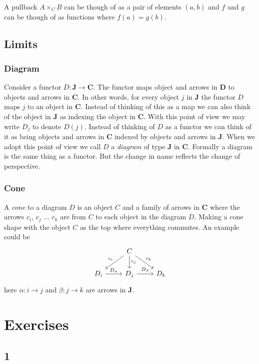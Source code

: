 \documentclass{book}
\theoremstyle{definition}
\begin{document}
A pullback $A \times_{C} B$ can be though of as a pair of elements $(a, b)$ and
$f$ and $g$ can be though of as functions where $f(a) = g(b)$.

\section{Limits}




\subsection{Diagram}

Consider a functor $D : \textbf{J} \to \textbf{C}$. The functor maps object and
arrows in \textbf{D} to objects and arrows in \textbf{C}. In other words, for
every object $j$ in \textbf{J} the functor $D$ maps $j$ to an object in
\textbf{C}. Instead of thinking of this as a map we can also think of the object
in \textbf{J} as indexing the object in \textbf{C}. With this point of view we
may write $D_{j}$ to denote $D(j)$. Instead of thinking of $D$ as a functor we
can think of it as being objects and arrows in \textbf{C} indexed by objects and
arrows in \textbf{J}. When we adopt this point of view we call $D$ a
\emph{diagram} of type \textbf{J} in \textbf{C}. Formally a diagram is the same
thing as a functor. But the change in name reflects the change of perspective.

\subsection{Cone} A \emph{cone} to a diagram $D$ is an object $C$ and a family
of arrows in \textbf{C} where the arrows $c_i$, $c_j$ ... $c_k$ are from $C$ to
each object in the diagram $D$. Making a cone shape with the object $C$ as the
top where everything commutes. An example could be
\[
\begin{tikzcd}
                          & C \arrow[dl, "c_i"'] \arrow[d, "c_j"] \arrow[dr, "c_k"]  \\
  D_i \arrow[r, "D_\alpha"] & D_j \arrow[r, "D_\beta"]  & D_k
\end{tikzcd}
\]
here $\alpha : i \to j$ and $\beta : j \to k$ are arrows in \textbf{J}.


\chapter{Exercises}

\section{1}
\end{document}
